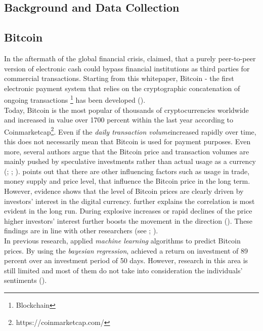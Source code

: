 \documentclass[a4paper,american,12pt]{article}
\begin{document}
\begin{spacing}{1.2}
\clearpage

\section{Background and Data Collection}
\label{sec:Background}
\subsection{Bitcoin}
In the aftermath of the global financial crisis, \textcite[p.~1]{Nakamoto2008Bitcoin} claimed, that a purely peer-to-peer version of electronic cash could bypass financial institutions as third parties for commercial transactions. Starting from this whitepaper, Bitcoin {-} the first electronic payment system that relies on the cryptographic concatenation of ongoing transactions \footnote{Blockchain} has been developed (\cite[p.~1]{Nakamoto2008Bitcoin}).\\

Today, Bitcoin is the most popular of thousands of cryptocurrencies worldwide and increased in value over 1700 percent within the last year according to Coinmarketcap\footnote{https://coinmarketcap.com/}. Even if the \textit{daily transaction volume}\footnotemark[2] increased rapidly over time, this does not necessarily mean that Bitcoin is used for payment purposes. Even more, several authors argue that the Bitcoin price and transaction volumes are mainly pushed by speculative investments rather than actual usage as a currency (\cite{corbet2017datestamping}; \cite{Forbes2017}; \cite{yermack2013bitcoin}). \textcite{kristoufek2015main} points out that there are other influencing factors such as usage in trade, money supply and price level, that influence the Bitcoin price in the long term. However, evidence shows that the level of Bitcoin prices are clearly driven by investors’ interest in the digital currency. \textcite{kristoufek2015main} further explains the correlation is most evident in the long run.  During explosive increases or rapid declines of the price higher investors’ interest further boosts the movement in the direction (\cite{kristoufek2015main}). These findings are in line with other researchers (see \cite[]{garcia2014digital}; \cite[]{kondor2014rich}).\\

In previous research, \textcite{madan2015automated} applied \textit{machine learning} algorithms to predict Bitcoin prices. By using the \textit{bayesian regression}, \textcite{shah2014bayesian} achieved a return on investment of 89 percent over an investment period of 50 days. However, research in this area is still limited and most of them do not take into consideration the individuals' sentiments (\cite[p.~1]{colianni2015algorithmic}).\\


\end{spacing}
\end{document}
